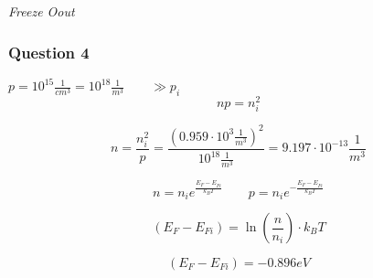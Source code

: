 \textit{Freeze Oout}

\subsubsection*{Question 4}

$p = 10^{15} \frac{1}{cm^3} = 10^{18} \frac{1}{m^3} \qquad \gg p_i$
$$np = n_i^2$$

$$n = \frac{n_i^2}{p} = \frac{(0.959 \cdot 10^3 \frac{1}{m^3})^2}{10^{18} \frac{1}{m^3}} = 9.197 \cdot 10^{-13} \frac{1}{m^3}$$

$$n = n_i e^{\frac{E_F-E_{Fi}}{k_BT}}  \qquad p = n_i e^{-\frac{E_F-E_{Fi}}{k_BT}}$$

$$(E_F-E_{Fi}) = \ln\left( \frac{n}{n_i} \right) \cdot k_BT$$

$$(E_F-E_{Fi}) = -0.896 eV $$